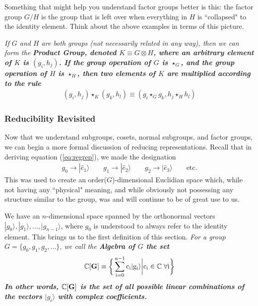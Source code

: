 \documentclass[12pt,epsf]{article}
\def\nolabel{\nonumber }
\def\nolabel{\nonumber }
\begin{document}
Something that might help you understand factor groups better is this:
the factor group $G/H$ is the group that is left over when everything
in $H$ is ``collapsed" to the identity element.  Think about the above
examples in terms of this picture.  

\it If $G$ and $H$ are both groups (not necessarily related in any
way), then we can form the \bf Product Group\it, denoted $K \equiv G
\otimes H$, where an arbitrary element of $K$ is $(g_i,h_j)$.  If the
group operation of $G$ is $\star_G$, and the group operation of $H$ is
$\star_H$, then two elements of $K$ are multiplied according to the
rule \begin{eqnarray}
(g_i,h_j)\star_K(g_k,h_l) \equiv (g_i \star_G g_k, h_j \star_H h_l)
\nolabel 
\end{eqnarray} \rm

\subsubsection{Reducibility Revisited}

Now that we understand subgroups, cosets, normal subgroups, and factor
groups, we can begin a more formal discussion of reducing
representations.  Recall that in deriving equation (\ref{eq:regrep}),
we made the designation 
\begin{eqnarray}
g_0 \rightarrow |\hat e_1 \rangle \qquad g_1 \rightarrow |\hat e_2
\rangle \qquad g_2 \rightarrow |\hat e_3\rangle \qquad \mbox{etc.} \nolabel 
\end{eqnarray}
This was used to create an order($G$)-dimensional Euclidian space
which, while not having any ``physical" meaning, and while obviously not
possessing any structure similar to the group, was and will continue to
be of great use to us.	

We have an $n$-dimensional space spanned by the orthonormal vectors
$|g_0\rangle, |g_1\rangle, \ldots, |g_{n-1}\rangle$, where $g_0$ is
understood to always refer to the identity element.  This brings us to
the first definition of this section.  \it For a group $G =
\{g_0,g_1,g_2,\ldots\}$, we call the \bf Algebra \it of $G$ the set 
\begin{eqnarray}
\mathbb{C}[\bf G\rm] \equiv \bigg\{ \sum_{i=0}^{n-1} c_i|g_i\rangle
\bigg| c_i \in \mathbb{C} \; \forall i \bigg\} \nolabel 
\end{eqnarray} \rm
In other words, $\mathbb{C}[\bf G\rm]$ is the set of all possible
linear combinations of the vectors $|g_i\rangle$ with complex
coefficients.  
\end{document}
